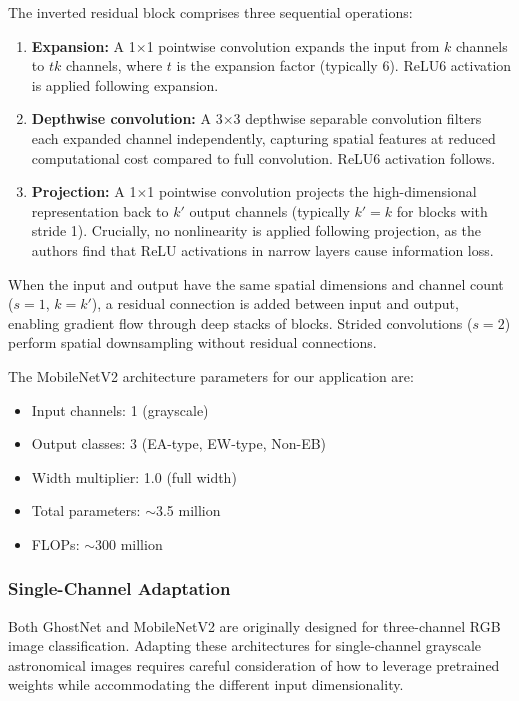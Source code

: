 \documentclass[11pt,a4paper]{article}
\newcommand{\EA}{EA-type}
\newcommand{\EW}{EW-type}
\begin{document}
The inverted residual block comprises three sequential operations:
\begin{enumerate}
    \item \textbf{Expansion:} A 1$\times$1 pointwise convolution expands the input from $k$ channels to $tk$ channels, where $t$ is the expansion factor (typically 6). ReLU6 activation is applied following expansion.
    
    \item \textbf{Depthwise convolution:} A 3$\times$3 depthwise separable convolution filters each expanded channel independently, capturing spatial features at reduced computational cost compared to full convolution. ReLU6 activation follows.
    
    \item \textbf{Projection:} A 1$\times$1 pointwise convolution projects the high-dimensional representation back to $k'$ output channels (typically $k' = k$ for blocks with stride 1). Crucially, no nonlinearity is applied following projection, as the authors find that ReLU activations in narrow layers cause information loss.
\end{enumerate}

When the input and output have the same spatial dimensions and channel count ($s = 1$, $k = k'$), a residual connection is added between input and output, enabling gradient flow through deep stacks of blocks. Strided convolutions ($s = 2$) perform spatial downsampling without residual connections.

The MobileNetV2 architecture parameters for our application are:
\begin{itemize}
    \item Input channels: 1 (grayscale)
    \item Output classes: 3 (\EA, \EW, Non-EB)
    \item Width multiplier: 1.0 (full width)
    \item Total parameters: $\sim$3.5 million
    \item FLOPs: $\sim$300 million
\end{itemize}

\subsubsection{Single-Channel Adaptation}

Both GhostNet and MobileNetV2 are originally designed for three-channel RGB image classification. Adapting these architectures for single-channel grayscale astronomical images requires careful consideration of how to leverage pretrained weights while accommodating the different input dimensionality.
\end{document}
